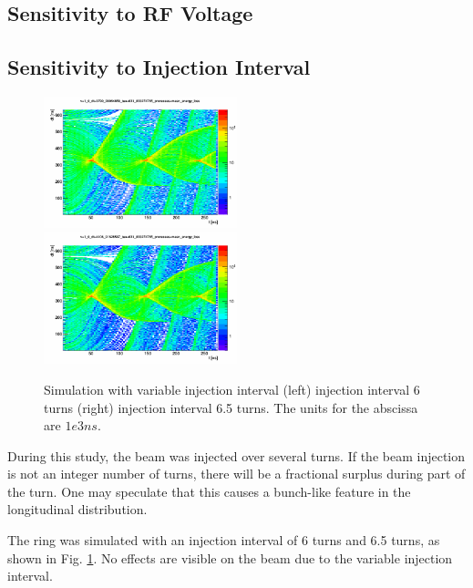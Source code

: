 \documentclass{paper}
\begin{document}
\subsection{Sensitivity to RF Voltage}


\subsection{Sensitivity to Injection Interval}

\begin{figure}
		\includegraphics[width=0.5\textwidth]{images/time_vs_dt_v=1_0_dt=3790_99964859_tau=631_833274765_processes=mean_energy_loss}
		\includegraphics[width=0.5\textwidth]{images/time_vs_dt_v=1_0_dt=4106_91628597_tau=631_833274765_processes=mean_energy_loss}
	\caption{Simulation with variable injection interval (left) injection interval
           6 turns (right) injection interval 6.5 turns. The units for the
           abscissa are $1e3 ns$.}
	\label{fig:mc_injection_interval}
\end{figure}

During this study, the beam was injected over several turns. If the beam 
injection is not an integer number of turns, there will be a fractional surplus
during part of the turn. One may speculate that this causes a bunch-like feature
in the longitudinal distribution.

The ring was simulated with an injection interval of 6 turns and 6.5 turns, as
shown in Fig. \ref{fig:mc_injection_interval}. No effects are visible on the 
beam due to the variable injection interval.
\end{document}
